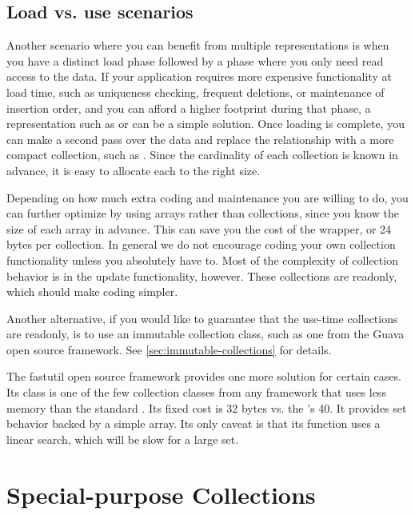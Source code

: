 \subsection{Load vs. use scenarios}

Another scenario where you can benefit from multiple representations is when you
have a distinct load phase followed by a phase where you only need read access
to the data. If your application requires more expensive functionality at load
time, such as uniqueness checking, frequent deletions, or maintenance of
insertion order, and you can afford a higher footprint during that phase, a
representation such as  or  can be a simple
solution. Once loading is complete, you can make a second pass over
the data and replace the relationship with a more compact collection, such
as . Since the cardinality of each collection is known in
advance, it is easy to allocate each  to the right size.

Depending on how much extra coding and maintenance you are willing to do, you
can further optimize by using arrays rather than collections, since you know the
size of each array in advance. This can save you
the cost of the  wrapper, or 24 bytes per collection. In
general we do not encourage coding your own collection functionality unless
you absolutely have to.  Most of the complexity of collection
behavior is in the update functionality, however. These collections are
readonly, which should make coding simpler.

Another alternative, if you would like to guarantee that the use-time
collections are readonly, is to use an immutable collection class, such as
one from the Guava open source framework. See
\autoref{sec:immutable-collections} for details.

The fastutil open source framework provides one more
solution for certain cases. Its  class is one of the few
collection classes from any framework that uses less memory than the standard .  Its
fixed cost is 32 bytes vs. the 's 40.  It provides set behavior
backed by a simple array. Its only caveat is that its  function
uses a linear search, which will be slow for a large set. 

\section{Special-purpose Collections}

